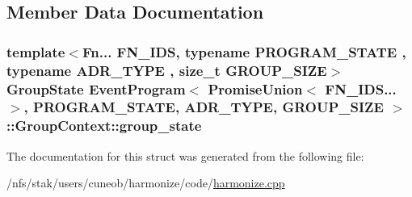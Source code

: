 \subsection{Member Data Documentation}
\hypertarget{structEventProgram_3_01PromiseUnion_3_01FN__IDS_8_8_8_4_00	PROGRAM__STATE_00	ADR__TYPE_00	GROUP__SIZE_01_4_1_1GroupContext_a98c667fc425c97186e5e92b68682f81b}{
\subsubsection[{group\-\_\-state}]{\setlength{\rightskip}{0pt plus 5cm}template$<$Fn... F\-N\-\_\-\-I\-D\-S, typename P\-R\-O\-G\-R\-A\-M\-\_\-\-S\-T\-A\-T\-E , typename A\-D\-R\-\_\-\-T\-Y\-P\-E , size\-\_\-t G\-R\-O\-U\-P\-\_\-\-S\-I\-Z\-E$>$ {\bf Group\-State} {\bf Event\-Program}$<$ {\bf Promise\-Union}$<$ F\-N\-\_\-\-I\-D\-S...$>$,	P\-R\-O\-G\-R\-A\-M\-\_\-\-S\-T\-A\-T\-E,	A\-D\-R\-\_\-\-T\-Y\-P\-E,	G\-R\-O\-U\-P\-\_\-\-S\-I\-Z\-E $>$\-::Group\-Context\-::group\-\_\-state}}\label{structEventProgram_3_01PromiseUnion_3_01FN__IDS_8_8_8_4_00	PROGRAM__STATE_00	ADR__TYPE_00	GROUP__SIZE_01_4_1_1GroupContext_a98c667fc425c97186e5e92b68682f81b}


The documentation for this struct was generated from the following file\-:\begin{DoxyCompactItemize}
\item 
/nfs/stak/users/cuneob/harmonize/code/\hyperlink{harmonize_8cpp}{harmonize.\-cpp}\end{DoxyCompactItemize}
